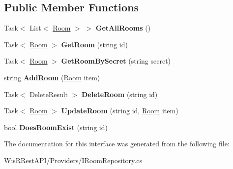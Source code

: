 \subsection*{Public Member Functions}
\begin{DoxyCompactItemize}
\item 
\hypertarget{interface_wis_r_rest_a_p_i_1_1_domain_model_1_1_i_room_repository_a4f310612830400bd7dea2353ae291e0b}{}Task$<$ List$<$ \hyperlink{class_wis_r_1_1_domain_models_1_1_room}{Room} $>$ $>$ {\bfseries Get\+All\+Rooms} ()\label{interface_wis_r_rest_a_p_i_1_1_domain_model_1_1_i_room_repository_a4f310612830400bd7dea2353ae291e0b}

\item 
\hypertarget{interface_wis_r_rest_a_p_i_1_1_domain_model_1_1_i_room_repository_a864195e1c22f6e9ec3adbfc9028f1f8d}{}Task$<$ \hyperlink{class_wis_r_1_1_domain_models_1_1_room}{Room} $>$ {\bfseries Get\+Room} (string id)\label{interface_wis_r_rest_a_p_i_1_1_domain_model_1_1_i_room_repository_a864195e1c22f6e9ec3adbfc9028f1f8d}

\item 
\hypertarget{interface_wis_r_rest_a_p_i_1_1_domain_model_1_1_i_room_repository_a90dd214074393f9ab5c9ad5f2f10373b}{}Task$<$ \hyperlink{class_wis_r_1_1_domain_models_1_1_room}{Room} $>$ {\bfseries Get\+Room\+By\+Secret} (string secret)\label{interface_wis_r_rest_a_p_i_1_1_domain_model_1_1_i_room_repository_a90dd214074393f9ab5c9ad5f2f10373b}

\item 
\hypertarget{interface_wis_r_rest_a_p_i_1_1_domain_model_1_1_i_room_repository_a650bead25dc50a3a31b562d447cfc3f9}{}string {\bfseries Add\+Room} (\hyperlink{class_wis_r_1_1_domain_models_1_1_room}{Room} item)\label{interface_wis_r_rest_a_p_i_1_1_domain_model_1_1_i_room_repository_a650bead25dc50a3a31b562d447cfc3f9}

\item 
\hypertarget{interface_wis_r_rest_a_p_i_1_1_domain_model_1_1_i_room_repository_adbe7ccdf32ef44cf3742c1eac718985c}{}Task$<$ Delete\+Result $>$ {\bfseries Delete\+Room} (string id)\label{interface_wis_r_rest_a_p_i_1_1_domain_model_1_1_i_room_repository_adbe7ccdf32ef44cf3742c1eac718985c}

\item 
\hypertarget{interface_wis_r_rest_a_p_i_1_1_domain_model_1_1_i_room_repository_a8f1c4a089fe9fe8c27d6ee29fb403f24}{}Task$<$ \hyperlink{class_wis_r_1_1_domain_models_1_1_room}{Room} $>$ {\bfseries Update\+Room} (string id, \hyperlink{class_wis_r_1_1_domain_models_1_1_room}{Room} item)\label{interface_wis_r_rest_a_p_i_1_1_domain_model_1_1_i_room_repository_a8f1c4a089fe9fe8c27d6ee29fb403f24}

\item 
\hypertarget{interface_wis_r_rest_a_p_i_1_1_domain_model_1_1_i_room_repository_abab22a58f3666d753cb45dac88375eca}{}bool {\bfseries Does\+Room\+Exist} (string id)\label{interface_wis_r_rest_a_p_i_1_1_domain_model_1_1_i_room_repository_abab22a58f3666d753cb45dac88375eca}

\end{DoxyCompactItemize}


The documentation for this interface was generated from the following file\+:\begin{DoxyCompactItemize}
\item 
Wis\+R\+Rest\+A\+P\+I/\+Providers/I\+Room\+Repository.\+cs\end{DoxyCompactItemize}
